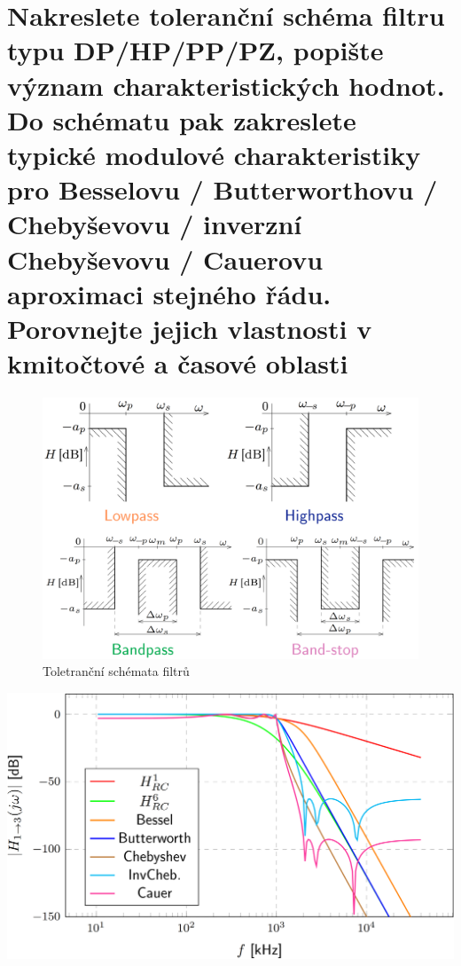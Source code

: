 \documentclass[a4paper,12pt]{article}   %
\begin{document}
\section{Nakreslete toleranční schéma filtru typu DP/HP/PP/PZ, popište význam charakteristických hodnot. Do schématu pak zakreslete typické modulové charakteristiky pro Besselovu / Butterworthovu / Chebyševovu / inverzní Chebyševovu / Cauerovu aproximaci stejného řádu. Porovnejte jejich vlastnosti v kmitočtové a časové oblasti}

\begin{figure}[H]
    \centering
    \includegraphics[width=.6\textwidth]{tolerancni_schema.PNG}
    \caption{Toletranční schémata filtrů}
    \label{fig:tolerancni:schemata}
\end{figure}
\begin{graf}[H]
    \centering
    \includegraphics[width=.8\textwidth]{modul-porovnani.PNG}
    \caption{Porovnání modulových charakteristik všech aproximací}
    \label{graf:modul:porovnani}
\end{graf}
\end{document}
